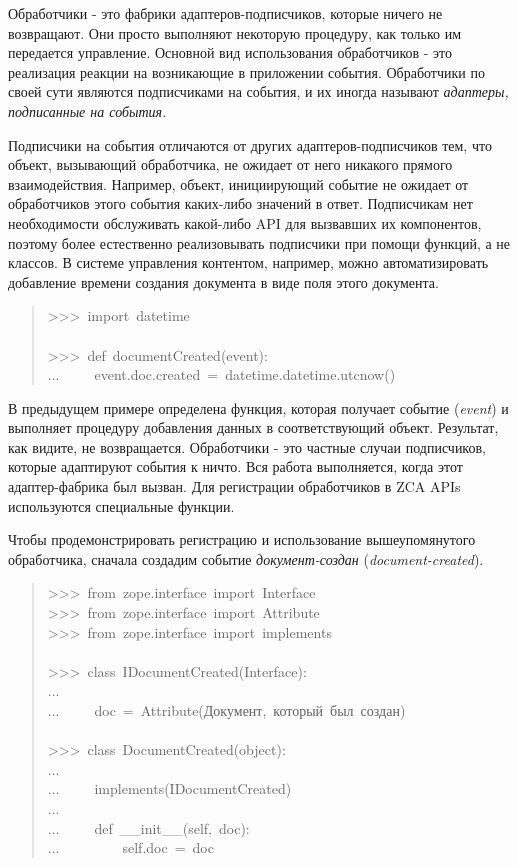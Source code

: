 \documentclass[a4paper,openany,twoside,final]{book}
\providecommand*{\DUroletitlereference}[1]{\textsl{#1}}
\begin{document}
Обработчики - это фабрики адаптеров-подписчиков, которые ничего не
возвращают.  Они просто выполняют некоторую процедуру, как только им
передается управление.  Основной вид использования обработчиков - это
реализация реакции на возникающие в приложении события.  Обработчики
по своей сути являются подписчиками на события, и их иногда называют
\DUroletitlereference{адаптеры, подписанные на события}.

Подписчики на события отличаются от других адаптеров-подписчиков тем,
что объект, вызывающий обработчика, не ожидает от него никакого
прямого взаимодействия.  Например, объект, инициирующий событие не
ожидает от обработчиков этого события каких-либо значений в ответ.
Подписчикам нет необходимости обслуживать какой-либо API для
вызвавших их компонентов, поэтому более естественно реализовывать
подписчики при помощи функций, а не классов.  В системе управления
контентом, например, можно автоматизировать добавление времени
создания документа в виде поля этого документа.

\begin{quote}{\ttfamily \raggedright \noindent
>{}>{}>~import~datetime\\
~\\
>{}>{}>~def~documentCreated(event):\\
...~~~~~event.doc.created~=~datetime.datetime.utcnow()
}
\end{quote}

В предыдущем примере определена функция, которая получает событие
(\DUroletitlereference{event}) и выполняет процедуру добавления данных в соответствующий
объект.  Результат, как видите, не возвращается.  Обработчики - это
частные случаи подписчиков, которые адаптируют события к \textquotedbl{}ничто\textquotedbl{}.  Вся
работа выполняется, когда этот адаптер-\textquotedbl{}фабрика\textquotedbl{} был вызван.  Для
регистрации обработчиков в ZCA APIs используются специальные функции.

Чтобы продемонстрировать регистрацию и использование вышеупомянутого
обработчика, сначала создадим событие \DUroletitlereference{документ-создан}
(\DUroletitlereference{document-created}).

\begin{quote}{\ttfamily \raggedright \noindent
>{}>{}>~from~zope.interface~import~Interface\\
>{}>{}>~from~zope.interface~import~Attribute\\
>{}>{}>~from~zope.interface~import~implements\\
~\\
>{}>{}>~class~IDocumentCreated(Interface):\\
...\\
...~~~~~doc~=~Attribute(\textquotedbl{}Документ,~который~был~создан\textquotedbl{})\\
~\\
>{}>{}>~class~DocumentCreated(object):\\
...\\
...~~~~~implements(IDocumentCreated)\\
...\\
...~~~~~def~\_\_init\_\_(self,~doc):\\
...~~~~~~~~~self.doc~=~doc
}
\end{quote}
\end{document}
